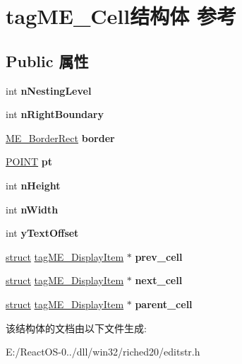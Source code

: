 \hypertarget{structtag_m_e___cell}{}\section{tag\+M\+E\+\_\+\+Cell结构体 参考}
\label{structtag_m_e___cell}
\subsection*{Public 属性}
\begin{DoxyCompactItemize}
\item 
\mbox{\label{structtag_m_e___cell_ac5acf26ae4c60d662544cf5fbcdf22ad}} 
int {\bfseries n\+Nesting\+Level}
\item 
\mbox{\label{structtag_m_e___cell_a5e8708775dee0df93be4b62777d5eea0}} 
int {\bfseries n\+Right\+Boundary}
\item 
\mbox{\label{structtag_m_e___cell_ab46f131ecfaf94ed7dbbff6e61310a3e}} 
\hyperlink{structtag_m_e___border_rect}{M\+E\+\_\+\+Border\+Rect} {\bfseries border}
\item 
\mbox{\label{structtag_m_e___cell_a44a0c549edd2b52a8f32b31ceef1ace8}} 
\hyperlink{structtag_p_o_i_n_t}{P\+O\+I\+NT} {\bfseries pt}
\item 
\mbox{\label{structtag_m_e___cell_a44cb85d3dd53111a306e0ef7d8c930dd}} 
int {\bfseries n\+Height}
\item 
\mbox{\label{structtag_m_e___cell_af2cf39fcaef5cd07146e2198061d4344}} 
int {\bfseries n\+Width}
\item 
\mbox{\label{structtag_m_e___cell_ae7d1add8e707f4bf2c682950d9c40024}} 
int {\bfseries y\+Text\+Offset}
\item 
\mbox{\label{structtag_m_e___cell_a2ecb81eb913600b38a2920688e9bce41}} 
\hyperlink{interfacestruct}{struct} \hyperlink{structtag_m_e___display_item}{tag\+M\+E\+\_\+\+Display\+Item} $\ast$ {\bfseries prev\+\_\+cell}
\item 
\mbox{\label{structtag_m_e___cell_ab30c433839ca67bfd1581838f39e8b00}} 
\hyperlink{interfacestruct}{struct} \hyperlink{structtag_m_e___display_item}{tag\+M\+E\+\_\+\+Display\+Item} $\ast$ {\bfseries next\+\_\+cell}
\item 
\mbox{\label{structtag_m_e___cell_a9080d4f6a150cabfdab98a2c9e0d2a67}} 
\hyperlink{interfacestruct}{struct} \hyperlink{structtag_m_e___display_item}{tag\+M\+E\+\_\+\+Display\+Item} $\ast$ {\bfseries parent\+\_\+cell}
\end{DoxyCompactItemize}


该结构体的文档由以下文件生成\+:\begin{DoxyCompactItemize}
\item 
E\+:/\+React\+O\+S-\/0../dll/win32/riched20/editstr.\+h\end{DoxyCompactItemize}
